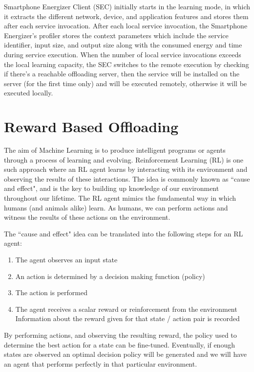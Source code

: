 \documentclass[12pt]{report}
\begin{document}
Smartphone Energizer Client (SEC) initially starts in the learning mode, in which it extracts the different network, device, and application features and stores them after each service invocation. After each local service invocation, the
Smartphone Energizer’s profiler stores the context parameters which include the service identifier, input size, and output size along with the consumed energy and time during service execution. When the number of local service invocations exceeds the local
learning capacity, the SEC switches to the remote execution by checking if there's a reachable offloading server, then the service will be installed on the server (for the first time only) and will be executed remotely, otherwise it will be executed locally.

\chapter{Reward Based Offloading} %
\label{chap:RewardBasedOffloading}

The aim of Machine Learning is to produce intelligent programs or agents through a process of learning and evolving. Reinforcement Learning (RL) is one such approach where an RL agent learns by interacting with its environment and observing the results of these interactions. The idea is commonly known as ``cause and effect", and is the key to building up knowledge of our environment throughout our lifetime. The RL agent mimics the fundamental way in which humans (and animals alike) learn. As humans, we can perform actions and witness the results of these actions on the environment.


The ``cause and effect" idea can be translated into the following steps for an RL agent:
\begin{enumerate}
    \item The agent observes an input state
    \item An action is determined by a decision making function (policy)
    \item The action is performed
    \item The agent receives a scalar reward or reinforcement from the environment
    Information about the reward given for that state / action pair is recorded
\end{enumerate}
By performing actions, and observing the resulting reward, the policy used to determine the best action for a state can be fine-tuned. Eventually, if enough states are observed an optimal decision policy will be generated and we will have an agent that performs perfectly in that particular environment. 
\end{document}
